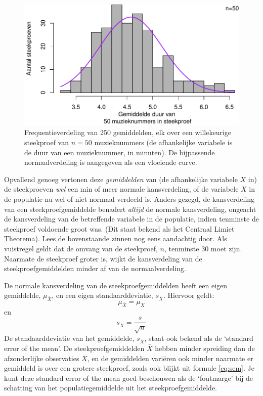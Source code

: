 \documentclass[
]{book}
\begin{document}
\begin{figure}
\centering
\includegraphics{KMS-NL_files/figure-latex/itunesmeanshist-1.pdf}
\caption{\label{fig:itunesmeanshist}Frequentieverdeling van 250 gemiddelden, elk over een willekeurige steekproef van \(n=50\) muzieknummers (de afhankelijke variabele is de duur van een muzieknummer, in minuten). De bijpassende normaalverdeling is aangegeven als een vloeiende curve.}
\end{figure}

Opvallend genoeg vertonen deze \emph{gemiddelden} van (de afhankelijke
variabele \(X\) in) de steekproeven \emph{wel} een min of meer normale kansverdeling, of de
variabele \(X\) in de populatie nu wel of niet normaal verdeeld is. Anders
gezegd, de kansverdeling van een steekproefgemiddelde benadert \emph{altijd} de
normale kansverdeling, ongeacht de kansverdeling van de betreffende
variabele in de populatie, indien tenminste de steekproef voldoende
groot was. (Dit staat bekend als het Centraal Limiet Theorema). Lees de
bovenstaande zinnen nog eens aandachtig door. Als vuistregel geldt dat
de omvang van de steekproef, \(n\), tenminste 30 moet zijn. Naarmate de
steekproef groter is, wijkt de kansverdeling van de
steekproefgemiddelden minder af van de normaalverdeling.

De normale kansverdeling van de steekproefgemiddelden heeft een eigen
gemiddelde, \(\mu_{\bar{X}}\), en een eigen standaarddeviatie,
\(s_{\bar{X}}\). Hiervoor geldt:
\begin{equation}
    \mu_{\bar{X}} = \mu_X
    \label{eq:meanofmean}
\end{equation}
en
\begin{equation}
    s_{\bar{X}} = \frac{s}{\sqrt{n}}
    \label{eq:sem}
\end{equation}
De standaarddeviatie van het
gemiddelde, \(s_{\bar{X}}\), staat ook bekend als de `standard error of
the mean'. De steekproefgemiddelden \(\bar{X}\) hebben minder spreiding
dan de afzonderlijke observaties \(X\), en de gemiddelden variëren ook
minder naarmate er gemiddeld is over een grotere steekproef, zoals ook
blijkt uit formule \eqref{eq:sem}. Je kunt deze standard error of the mean goed
beschouwen als de `foutmarge' bij de schatting van het
populatiegemiddelde uit het steekproefgemiddelde.
\end{document}
